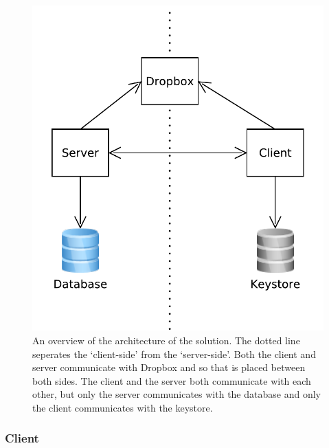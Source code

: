 \documentclass[12pt, titlepage]{article}
\begin{document}
\begin{figure}
\centerline{\includegraphics[scale=0.5]{diagrams/architecture/architecure.pdf}}
\caption{An overview of the architecture of the solution. The dotted line seperates the `client-side' from the `server-side'. Both the client and server communicate with Dropbox and so that is placed between both sides. The client and the server both communicate with each other, but only the server communicates with the database and only the client communicates with the keystore.}
\label{fig:architectureOverview}
\end{figure} 

\subsubsection{Client}
\end{document}
